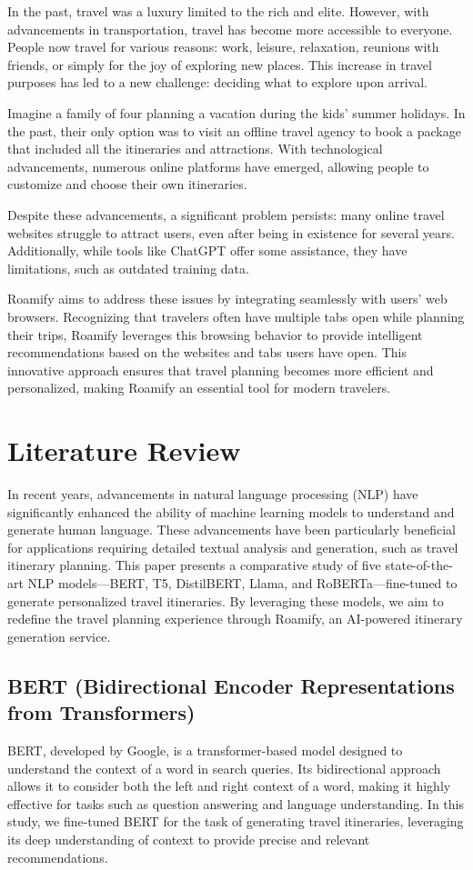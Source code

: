 \documentclass[conference]{IEEEtran}
\begin{document}
    In the past, travel was a luxury limited to the rich and elite. However, with advancements in transportation, travel has become more accessible to everyone. People now travel for various reasons: work, leisure, relaxation, reunions with friends, or simply for the joy of exploring new places. This increase in travel purposes has led to a new challenge: deciding what to explore upon arrival.
    
    Imagine a family of four planning a vacation during the kids' summer holidays. In the past, their only option was to visit an offline travel agency to book a package that included all the itineraries and attractions. With technological advancements, numerous online platforms have emerged, allowing people to customize and choose their own itineraries.
    
    Despite these advancements, a significant problem persists: many online travel websites struggle to attract users, even after being in existence for several years. Additionally, while tools like ChatGPT offer some assistance, they have limitations, such as outdated training data.
    
    Roamify aims to address these issues by integrating seamlessly with users' web browsers. Recognizing that travelers often have multiple tabs open while planning their trips, Roamify leverages this browsing behavior to provide intelligent recommendations based on the websites and tabs users have open. This innovative approach ensures that travel planning becomes more efficient and personalized, making Roamify an essential tool for modern travelers.


\section{Literature Review}

In recent years, advancements in natural language processing (NLP) have significantly enhanced the ability of machine learning models to understand and generate human language. These advancements have been particularly beneficial for applications requiring detailed textual analysis and generation, such as travel itinerary planning. This paper presents a comparative study of five state-of-the-art NLP models—BERT, T5, DistilBERT, Llama, and RoBERTa—fine-tuned to generate personalized travel itineraries. By leveraging these models, we aim to redefine the travel planning experience through Roamify, an AI-powered itinerary generation service.

\subsection{BERT (Bidirectional Encoder Representations from Transformers)}
BERT, developed by Google, is a transformer-based model designed to understand the context of a word in search queries. Its bidirectional approach allows it to consider both the left and right context of a word, making it highly effective for tasks such as question answering and language understanding. In this study, we fine-tuned BERT for the task of generating travel itineraries, leveraging its deep understanding of context to provide precise and relevant recommendations.
\end{document}
